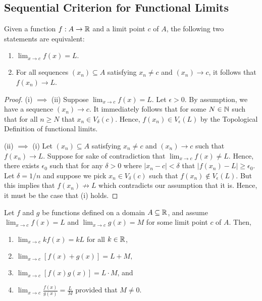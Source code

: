\subsection{Sequential Criterion for Functional Limits}

\begin{theorem}
    Given a function \( f: A \to \mathbb{R}  \) and a limit point \( c \) of \( A \), the following two statements are equivalent: 
    \begin{enumerate}
        \item[(i)] \( \lim_{ x \to c } f(x) = L. \)
        \item[(ii)] For all sequences \( (x_n) \subseteq A  \) satisfying \( x_n \neq c  \) and \( (x_n) \to c  \), it follows that \( f(x_n) \to L  \).
    \end{enumerate}
    \end{theorem}

\begin{proof}
    (i) \( \implies \) (ii) Suppose \( \lim_{ x  \to c } f(x) = L  \). Let \( \epsilon > 0  \). By assumption, we have a sequence \( (x_n) \to c  \). It immediately follows that for some \( N \in \mathbb{N}  \) such that for all \( n \geq N  \) that \( x_n \in V_{\delta}(c) \). Hence, \( f(x_n) \in V_{\epsilon }(L) \) by the Topological Definition of functional limits.
 
    (ii) \( \implies \) (i) Let \( (x_n) \subseteq A  \) satisfying \( x_n \neq c  \) and \( (x_n) \to  c \) such that \( f(x_n) \to L  \). Suppose for sake of contradiction that \( \lim_{ x \to c } f(x) \neq L  \). Hence, there exists \( \epsilon_0 \) such that for any \( \delta > 0  \) where \( | x_n -c  | < \delta \) that \( | f(x_n) - L  | \geq \epsilon_0 \). Let \( \delta = 1/n \) and suppose we pick \( x_n \in V_{\delta}(c) \) such that \( f(x_n) \notin V_{\epsilon }(L) \). But this implies that \( f(x_n) \not \to L  \) which contradicts our assumption that it is. Hence, it must be the case that (i) holds.
\end{proof}
\begin{theorem}
    Let \( f \) and \( g \) be functions defined on a domain \( A \subseteq \mathbb{R}  \), and assume \( \lim_{ x \to c } f(x) = L  \) and \( \lim_{ x \to c } g(x) = M  \) for some limit point \( c \) of \( A  \). Then, 
    \begin{enumerate}
        \item[(i)] \( \lim_{ x \to c } kf(x) = kL  \) for all \( k \in \mathbb{R}  \),
        \item[(ii)] \( \lim_{ x \to c } [f(x) + g(x)] = L + M, \)
        \item[(iii)] \( \lim_{ x \to c } [f(x)g(x)] = L \cdot M  \), and 
        \item[(iv)] \( \lim_{ x \to c } \frac{ f(x) }{ g(x)  } = \frac{ L }{ M }  \) provided that \( M \neq  0 \).
    \end{enumerate}
    \end{theorem}

